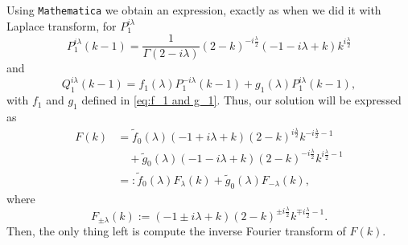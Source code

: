 \documentclass[%
 aip,
 jmp,%
 amsmath,amssymb,
 reprint,%
]{revtex4-2}
\begin{document}
Using \texttt{Mathematica} we obtain an expression, exactly as when we did it with Laplace transform, for $P_1^{i\lambda}$
\begin{equation}
    P_1^{i\lambda}(k - 1) = \frac{1}{\Gamma(2-i\lambda)}(2-k)^{-i\frac{\lambda}{2}}(-1-i\lambda + k)k^{i\frac{\lambda}{2}}
\end{equation}
and
\begin{equation}
    Q_1^{i\lambda}(k - 1) = f_1(\lambda)P_1^{-i\lambda}(k - 1) + g_1(\lambda)P_1^{i\lambda}(k - 1),
\end{equation}
with $f_1$ and $g_1$ defined in \eqref{eq:f_1 and g_1}. Thus, our solution will be expressed as
\begin{equation}
\begin{aligned}
    F(k) &= \tilde{f}_0(\lambda)(-1 + i\lambda + k)(2 - k)^{i\frac{\lambda}{2}}k^{-i\frac{\lambda}{2} - 1}\\
    &\quad + \tilde{g}_0(\lambda)(-1 - i\lambda + k)(2 - k)^{-i\frac{\lambda}{2}}k^{i\frac{\lambda}{2} - 1}\\
    &=: \tilde{f}_0(\lambda)F_{\lambda}(k) + \tilde{g}_0(\lambda)F_{-\lambda}(k), 
\end{aligned}
\end{equation}
where
\begin{equation}
    F_{\pm \lambda}(k) := (-1 \pm i\lambda + k)(2 - k)^{\pm i\frac{\lambda}{2}}k^{\mp i\frac{\lambda}{2} - 1}.
\end{equation}
Then, the only thing left is compute the inverse Fourier transform of $F(k)$.
\end{document}
